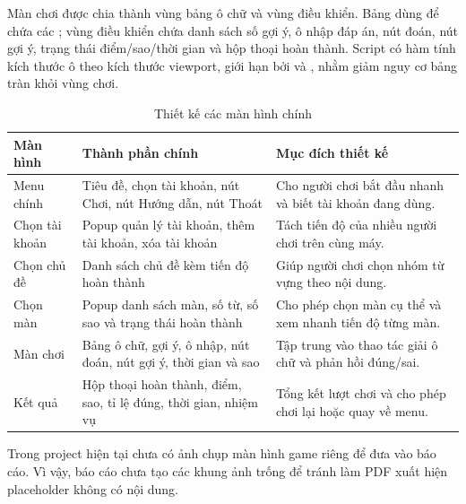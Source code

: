 \documentclass[../DoAn.tex]{subfiles}
\begin{document}
Màn chơi được chia thành vùng bảng ô chữ và vùng điều khiển. Bảng dùng  để chứa các ; vùng điều khiển chứa danh sách số gợi ý, ô nhập đáp án, nút đoán, nút gợi ý, trạng thái điểm/sao/thời gian và hộp thoại hoàn thành. Script  có hàm tính kích thước ô theo kích thước viewport, giới hạn bởi  và , nhằm giảm nguy cơ bảng tràn khỏi vùng chơi.

\begin{table}[H]
\centering
\small
\begin{tabularx}{\textwidth}{|>{\RaggedRight\arraybackslash}p{3.2cm}|>{\RaggedRight\arraybackslash}p{4.4cm}|>{\RaggedRight\arraybackslash}X|}
\hline
\textbf{Màn hình} & \textbf{Thành phần chính} & \textbf{Mục đích thiết kế} \\ \hline
Menu chính & Tiêu đề, chọn tài khoản, nút Chơi, nút Hướng dẫn, nút Thoát & Cho người chơi bắt đầu nhanh và biết tài khoản đang dùng. \\ \hline
Chọn tài khoản & Popup quản lý tài khoản, thêm tài khoản, xóa tài khoản & Tách tiến độ của nhiều người chơi trên cùng máy. \\ \hline
Chọn chủ đề & Danh sách chủ đề kèm tiến độ hoàn thành & Giúp người chơi chọn nhóm từ vựng theo nội dung. \\ \hline
Chọn màn & Popup danh sách màn, số từ, số sao và trạng thái hoàn thành & Cho phép chọn màn cụ thể và xem nhanh tiến độ từng màn. \\ \hline
Màn chơi & Bảng ô chữ, gợi ý, ô nhập, nút đoán, nút gợi ý, thời gian và sao & Tập trung vào thao tác giải ô chữ và phản hồi đúng/sai. \\ \hline
Kết quả & Hộp thoại hoàn thành, điểm, sao, tỉ lệ đúng, thời gian, nhiệm vụ & Tổng kết lượt chơi và cho phép chơi lại hoặc quay về menu. \\ \hline
\end{tabularx}
\caption{Thiết kế các màn hình chính}
\label{table:ui_screens}
\end{table}


Trong project hiện tại chưa có ảnh chụp màn hình game riêng để đưa vào báo cáo. Vì vậy, báo cáo chưa tạo các khung ảnh trống để tránh làm PDF xuất hiện placeholder không có nội dung.
\end{document}
